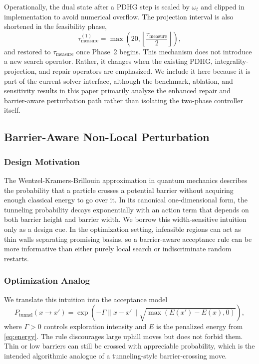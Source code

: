 Operationally, the dual state after a PDHG step is scaled by $\omega_t$ and clipped in implementation to avoid numerical overflow. The projection interval is also shortened in the feasibility phase,
\begin{equation}
\tau_{\mathrm{measure}}^{(1)} = \max\!\left(20, \left\lfloor \frac{\tau_{\mathrm{measure}}}{2} \right\rfloor \right),
\label{eq:phase_measure}
\end{equation}
and restored to $\tau_{\mathrm{measure}}$ once Phase~2 begins. This mechanism does not introduce a new search operator. Rather, it changes when the existing PDHG, integrality-projection, and repair operators are emphasized. We include it here because it is part of the current solver interface, although the benchmark, ablation, and sensitivity results in this paper primarily analyze the enhanced repair and barrier-aware perturbation path rather than isolating the two-phase controller itself.

\subsection{Barrier-Aware Non-Local Perturbation}
\label{subsec:tunneling}

\subsubsection{Design Motivation}

The Wentzel-Kramers-Brillouin approximation in quantum mechanics describes the probability that a particle crosses a potential barrier without acquiring enough classical energy to go over it. In its canonical one-dimensional form, the tunneling probability decays exponentially with an action term that depends on both barrier height and barrier width. We borrow this width-sensitive intuition only as a design cue. In the optimization setting, infeasible regions can act as thin walls separating promising basins, so a barrier-aware acceptance rule can be more informative than either purely local search or indiscriminate random restarts.

\subsubsection{Optimization Analog}

We translate this intuition into the acceptance model
\begin{equation}
P_{\text{tunnel}}(x \to x') = \exp\left(-\Gamma \|x - x'\| \sqrt{\max(E(x') - E(x), 0)}\right),
\label{eq:tunnel_prob}
\end{equation}
where $\Gamma > 0$ controls exploration intensity and $E$ is the penalized energy from \eqref{eq:energy}. The rule discourages large uphill moves but does not forbid them. Thin or low barriers can still be crossed with appreciable probability, which is the intended algorithmic analogue of a tunneling-style barrier-crossing move.

